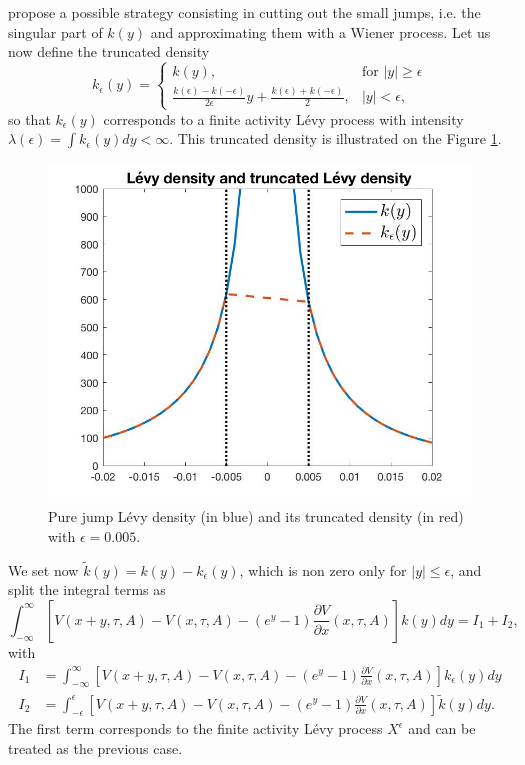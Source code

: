 \citeauthor{CV05} propose a possible strategy consisting in cutting out the small jumps, i.e. the singular part of $k(y)$ and approximating them with a Wiener process. Let us now define the truncated density 
$$k_\epsilon(y)=\begin{cases}
k(y), &\text{for }|y|\geq\epsilon\\
\frac{k(\epsilon)-k(-\epsilon)}{2\epsilon}y+\frac{k(\epsilon)+k(-\epsilon)}{2}, &|y|<\epsilon,
\end{cases}$$
so that $k_\epsilon(y)$ corresponds to a finite activity L\'evy process with intensity $\lambda(\epsilon) = \int k_\epsilon(y)dy < \infty$. This truncated density is illustrated on the Figure \ref{fig:FD:pj_density}.
\begin{figure}[!htb]
\centering
	\includegraphics[scale=0.3]{gfx/Trunc_density}
	\caption{Pure jump L\'evy density (in blue) and its truncated density (in red) with $\epsilon = 0.005$.}
	\label{fig:FD:pj_density}
\end{figure}

We set now $\tilde{k}(y) = k(y) -k_\epsilon(y)$, which is non zero only for $|y|\leq\epsilon$, and split the integral terms as
$$\int_{-\infty}^\infty \left[V(x+y,\tau,A)-V(x,\tau,A)-\left(e^y-1\right)\frac{\partial V}{\partial x}(x,\tau,A)\right]k(y)dy =I_1+I_2,$$
with
\begin{align*}
I_1 &= \int_{-\infty}^{\infty}\left[V(x+y,\tau,A)-V(x,\tau,A)-\left(e^y-1\right)\frac{\partial V}{\partial x}(x,\tau,A)\right]k_\epsilon(y)dy\\
I_2 &= \int_{-\epsilon}^{\epsilon}\left[V(x+y,\tau,A)-V(x,\tau,A)-\left(e^y-1\right)\frac{\partial V}{\partial x}(x,\tau,A)\right]\tilde{k}(y)dy.
\end{align*}
The first term corresponds to the finite activity L\'evy process $X^\epsilon$ and can be treated as the previous case.


